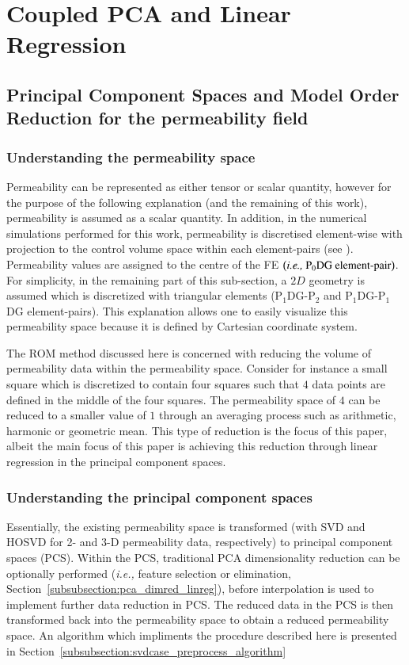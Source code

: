 \documentclass[preprint,12pt]{elsarticle}
\newcommand{\PN}[2][error]{P$_{#1}$DG-P$_{#2}$}
\newcommand{\PNDG}[2][error]{P$_{#1}$DG-P$_{#2}$DG}
\newcommand{\ie}{{\it i.e., }}
\begin{document}
\section{Coupled PCA and Linear Regression}\label{section:pca_linreg}

\subsection{Principal Component Spaces and Model Order Reduction for the permeability field}\label{subsection:pcspaces}
  
\subsubsection{Understanding the permeability space}\label{subsubsection:visualization_permspace}
Permeability can be represented as either tensor or scalar quantity, however for the purpose of the following explanation (and the remaining of this work), permeability is assumed as a scalar quantity. In addition, in the numerical simulations performed for this work, permeability is discretised element-wise with projection to the control volume space within each element-pairs (see \cite{Christou_2018}). Permeability values are assigned to the centre of the FE $\left(\text{\ie P}_{0}\text{DG element-pair}\right)$. For simplicity, in the remaining part of this sub-section, a $2D$ geometry is assumed which is discretized with triangular elements (\PN[1]{2} and \PNDG[1]{1} element-pairs). This explanation allows one to easily visualize this permeability space because it is defined by Cartesian coordinate system.

The ROM method discussed here is concerned with reducing the volume of permeability data within the permeability space. Consider for instance a small square which is discretized to contain four squares such that $4$ data points are defined in the middle of the four squares. The permeability space of $4$ can be reduced to a smaller value of $1$ through an averaging process such as arithmetic, harmonic or geometric mean. This type of reduction is the focus of this paper, albeit the main focus of this paper is achieving this reduction through linear regression in the principal component spaces. 

\subsubsection{Understanding the principal component spaces}\label{subsubsection:visualization_pcspaces}
Essentially, the existing permeability space is transformed (with SVD and HOSVD for 2- and 3-D permeability data, respectively) to principal component spaces (PCS). Within the PCS, traditional PCA dimensionality reduction can be optionally performed (\ie{feature selection or elimination}, Section~\ref{subsubsection:pca_dimred_linreg}), before interpolation is used to implement further data reduction in PCS. The reduced data in the PCS is then transformed back into the permeability space to obtain a reduced permeability space. An algorithm which impliments the procedure described here is presented in Section~\ref{subsubsection:svdcase_preprocess_algorithm}
\end{document}
